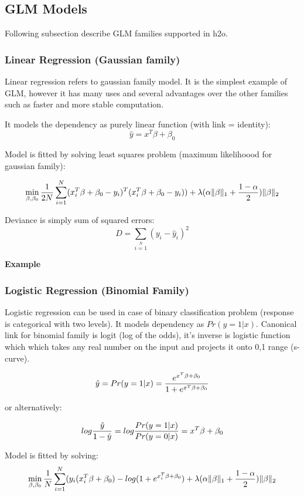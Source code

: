 \documentclass[11pt]{article}
\begin{document}
\subsection{GLM Models} 
Following subsection describe GLM families supported in h2o. 

\subsubsection{Linear Regression (Gaussian family) }
Linear regression refers to gaussian family model. It is the simplest example of GLM, however it has many uses and several advantages over the other families such as faster and more stable computation. 

It models the dependency as purely linear function (with link = identity):
\[ \hat{y} = x^T\beta + \beta_0\]

Model is fitted by solving least squares problem (maximum likelihoood for gaussian family):

\[ \min\limits_{\beta,\beta_0} { {1 \over 2N}\sum\limits_{i=1}\limits^{N}(x_i^{T}\beta  + \beta_0- y_i)^T (x_i^{T}\beta + \beta_0 - y_i))  + \lambda (\alpha \|\beta \|_1 + {1-\alpha \over 2}) \|\beta\|_2} \]


Deviance is simply sum of squared errors:
\[ D = \sum\limits_{i=1}\limits^{N}{(y_i - \hat{y}_i)^2} \]


\textbf{Example}



\subsubsection{Logistic Regression (Binomial Family)}
Logistic regression can be used in case of binary classification problem (response is categorical with two levels). It models dependency as $Pr(y = 1|x)$. Canonical link for binomial family is logit (log of the odds), it's inverse is logistic function which which takes any real number on the input and projects it onto 0,1 range (s-curve). 

\[ \hat{y} = Pr(y = 1|x) = {e^{x^T\beta + \beta_0} \over 1 + e^{x^T \beta + \beta_0} } \]

or alternatively:


\[log {\hat{y} \over 1- \hat{y}} = log{Pr(y=1|x) \over Pr(y=0|x)} = x^T \beta + \beta_0\]

Model is fitted by solving:
\[  \min\limits_{\beta,\beta_0} { {1 \over N}\sum\limits_{i=1}\limits^{N}(y_i (x_i^{T}\beta  + \beta_0) - log (1 + e^{x_i^{T}\beta  + \beta_0} )  + \lambda (\alpha \|\beta \|_1 + {1-\alpha \over 2}) \|\beta\|_2} \]
\end{document}
